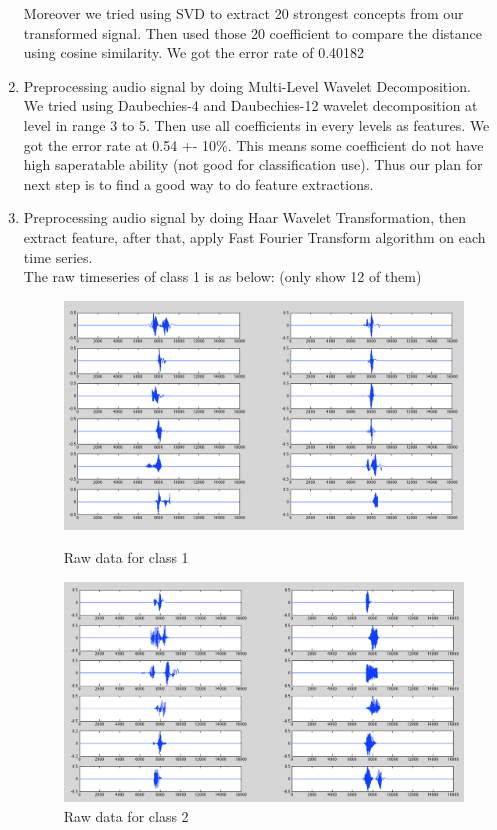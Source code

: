 \begin{enumerate}
Moreover we tried using SVD to extract 20 strongest concepts from our transformed signal. Then used those 20 coefficient to compare the distance using cosine similarity. We got the error rate of 0.40182

\item Preprocessing audio signal by doing Multi-Level Wavelet Decomposition.\\

We tried using Daubechies-4 and Daubechies-12 wavelet decomposition at level in range 3 to 5. Then use all coefficients in every levels as features. We got the error rate at 0.54 +- 10\%. This means some coefficient do not have high saperatable ability (not good for classification use). Thus our plan for next step is to find a good way to do feature extractions. 

\item Preprocessing audio signal by doing Haar Wavelet Transformation, then extract feature, after that, apply Fast Fourier Transform algorithm on each time series.\\
The raw timeseries of class 1 is as below: (only show 12 of them)\\

\begin{figure}[H]

\includegraphics[scale=.4]{PIC/raw_class1.png}
\caption{Raw data for class 1}
\includegraphics[scale=.4]{PIC/raw_class2.png}
\caption{Raw data for class 2}
\end{figure}



\end{enumerate}

